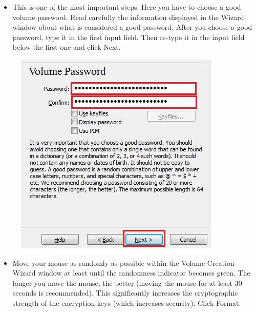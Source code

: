 \documentclass{tufte-handout}
\begin{document}
\begin{enumerate}
\begin{figure}
	\end{figure}
	\FloatBarrier
	\begin{itemize}
		\item  This is one of the most important steps. Here you have to choose a good volume password. Read carefully the information displayed in the Wizard window about what is considered a good password.
		After you choose a good password, type it in the first input field. Then re-type it in the input field below the first one and click Next.
	\end{itemize}
	\begin{figure}%
		\includegraphics[width=\linewidth]{img/vc_install_8.png}
	\end{figure}
	\FloatBarrier
	\begin{itemize}
		\item  Move your mouse as randomly as possible within the Volume Creation Wizard window at least until the randomness indicator becomes green. The longer you move the mouse, the better (moving the mouse for at least 30 seconds is recommended). This significantly increases the cryptographic strength of the encryption keys (which increases security).
		Click Format.
	\end{itemize}
	\begin{figure}%

\end{figure}
\end{enumerate}
\end{document}
